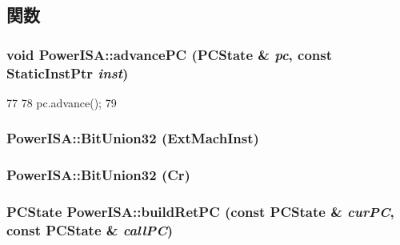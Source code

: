 \subsection{関数}
\hypertarget{namespacePowerISA_a67312797a70ccb3a25803a8c0dded1a9}{
\subsubsection[{advancePC}]{\setlength{\rightskip}{0pt plus 5cm}void PowerISA::advancePC (PCState \& {\em pc}, \/  const {\bf StaticInstPtr} {\em inst})}}
\label{namespacePowerISA_a67312797a70ccb3a25803a8c0dded1a9}



\begin{DoxyCode}
77 {
78     pc.advance();
79 }
\end{DoxyCode}
\hypertarget{namespacePowerISA_ae6138c1a89d88d75d610318542516cc3}{
\subsubsection[{BitUnion32}]{\setlength{\rightskip}{0pt plus 5cm}PowerISA::BitUnion32 (ExtMachInst)}}
\label{namespacePowerISA_ae6138c1a89d88d75d610318542516cc3}
\hypertarget{namespacePowerISA_ada69dcc10a02a7ceda35af957c434551}{
\subsubsection[{BitUnion32}]{\setlength{\rightskip}{0pt plus 5cm}PowerISA::BitUnion32 (Cr)}}
\label{namespacePowerISA_ada69dcc10a02a7ceda35af957c434551}
\hypertarget{namespacePowerISA_a361cc11954db6316494498bac005f406}{
\subsubsection[{buildRetPC}]{\setlength{\rightskip}{0pt plus 5cm}PCState PowerISA::buildRetPC (const PCState \& {\em curPC}, \/  const PCState \& {\em callPC})}}
\label{namespacePowerISA_a361cc11954db6316494498bac005f406}



